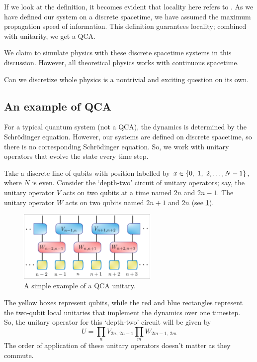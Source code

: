\documentclass[11pt, oneside, listof=totoc]{scrbook}
\begin{document}
If we look at the definition, it becomes evident that locality here refers to . As we have defined our system on a discrete spacetime, we have assumed the maximum propagation speed of information. This definition guarantees locality; combined with unitarity, we get a QCA.

\begin{moral}
    We claim to simulate physics with these discrete spacetime systems in this discussion. However, all theoretical physics works with continuous spacetime.

    \noindent Can we discretize whole physics is a nontrivial and exciting question on its own.
\end{moral}

\subsection[An example of QCA]{An example of QCA \cite{Farrelly2019}}\label{ssec:initial-rqc}

For a typical quantum system (not a QCA), the dynamics is determined by the Schr\"odinger equation. However, our systems are defined on discrete spacetime, so there is no corresponding Schr\"odinger equation. So, we work with unitary operators that evolve the state every time step.

Take a discrete line of qubits with position labelled by \(x \in \qty{0,~1,~2,\dots,N-1}\), where \(N\) is even. Consider the `depth-two' circuit of unitary operators; say, the unitary operator \(V\) acts on two qubits at a time named \(2 n\) and \(2 n - 1\). The unitary operator \(W\) acts on two qubits named \(2n+1\) and \(2n\) (see \cref{fig:qca-example}).

\begin{figure}[H]
    \centering
    \includegraphics[width = 0.6\textwidth]{qca-example.png}
    \caption{A simple example of a QCA unitary.}
    \label{fig:qca-example}
\end{figure} \noindent
The yellow boxes represent qubits, while the red and blue rectangles represent the two-qubit local unitaries that implement the dynamics over one timestep.\\
So, the unitary operator for this `depth-two' circuit will be given by
\begin{equation*}
    U = \prod_{n} V_{2n, ~ 2n-1} \prod_{m} W_{2m-1, ~2m}
\end{equation*}
The order of application of these unitary operators doesn't matter as they commute.
\end{document}
